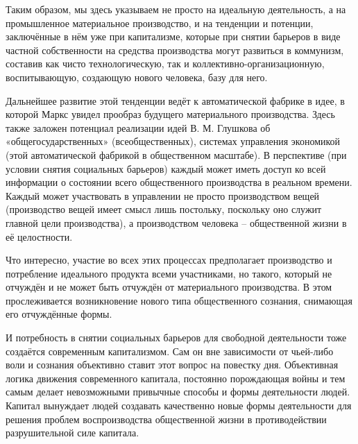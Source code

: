 \documentclass[../main]{subfiles}
\begin{document}
Таким образом, мы здесь указываем не просто на идеальную деятельность, а на промышленное материальное производство, и на тенденции и потенции, заключённые в нём уже при капитализме, которые при снятии барьеров в виде частной собственности на средства производства могут развиться в коммунизм, составив как чисто технологическую, так и коллективно-организационную, воспитывающую, создающую нового человека, базу для него.

Дальнейшее развитие этой тенденции ведёт к автоматической фабрике в идее, в которой Маркс увидел прообраз будущего материального производства. Здесь также заложен потенциал реализации идей В. М. Глушкова об «общегосударственных» (всеобщественных), системах управления экономикой (этой автоматической фабрикой в общественном масштабе). В перспективе (при условии снятия социальных барьеров) каждый может иметь доступ ко всей информации о состоянии всего общественного производства в реальном времени. Каждый может участвовать в управлении не просто производством вещей (производство вещей имеет смысл лишь постольку, поскольку оно служит главной цели производства), а производством человека – общественной жизни в её целостности.

Что интересно, участие во всех этих процессах предполагает производство и потребление идеального продукта всеми участниками, но такого, который не отчуждён и не может быть отчуждён от материального производства. В этом прослеживается возникновение нового типа общественного сознания, снимающая его отчуждённые формы.

И потребность в снятии социальных барьеров для свободной деятельности тоже создаётся современным капитализмом. Сам он вне зависимости от чьей-либо воли и сознания объективно ставит этот вопрос на повестку дня. Объективная логика движения современного капитала, постоянно порождающая войны и тем самым делает невозможными привычные способы и формы деятельности людей. Капитал вынуждает людей создавать качественно новые формы деятельности для решения проблем воспроизводства общественной жизни в противодействии разрушительной силе капитала.
\end{document}
